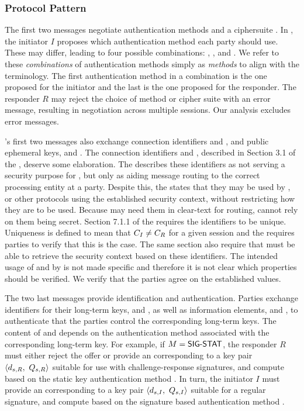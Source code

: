 \subsubsection{Protocol Pattern}
The first two messages negotiate authentication methods \mMethod{} and a
ciphersuite \mSuites{}.
%
In \mMethod{}, the initiator $I$ proposes which authentication method each
party should use.
%
These may differ, leading to four possible combinations:
\mSigSig{}, \mSigStat{}, \mStatSig{} and \mStatStat{}.
%
We refer to these \emph{combinations} of authentication methods simply as
\emph{methods} to align with the \mSpec{} terminology.
%
The first authentication method in a combination is the one proposed for the
initiator and the last is the one proposed for the responder.
%
The responder $R$ may reject the choice of method
or cipher suite with an error message, resulting in negotiation across
multiple \mEdhoc{} sessions.
%
Our analysis excludes error messages.
%

\mEdhoc{}'s first two messages also exchange connection identifiers \mCi{} and
\mCr{}, and public ephemeral keys, \mGx{} and \mGy{}.
%
The connection identifiers \mCi{} and \mCr{}, described in Section 3.1 of the
\mSpec{}, deserve some elaboration.
%
The \mSpec{} describes these identifiers as not serving a security purpose for
\mEdhoc{}, but only as aiding message routing to the correct \mEdhoc{} processing
entity at a party.
%
Despite this, the \mSpec{} states that they may be used by \mOscore{}, or other
protocols using the established security context, without restricting how they
are to be used.
%
Because \mEdhoc{} may need them in clear-text for routing, \mOscore{} cannot
rely on them being secret.
%
Section 7.1.1 of the \mSpec{} requires the identifiers to be unique.
%
Uniqueness is defined to mean that $C_I{} \not = C_R{}$ for a given session
and the \mSpec{} requires parties to verify that this is the case.
%
The same section also require that \mOscore{} must be able to retrieve the
security context based on these identifiers.
%
The intended usage of \mCi{} and \mCr{} by \mOscore{} is not made specific and
therefore it is not clear which properties should be verified.
%
We verify that the parties agree on the established values.
%

The two last messages provide identification and authentication.
%
Parties exchange identifiers for their long-term keys, \mIdcredi{} and \mIdcredr{},
as well as information elements, \mAuthi{} and \mAuthr{}, to authenticate
that the parties control the corresponding long-term keys.
%
The content of \mAuthi{} and \mAuthr{} depends on the authentication method
associated with the corresponding long-term key.
%
For example, if $M{} = \textsf{SIG-STAT}{}$, the responder $R$ must either
reject the offer or provide an \mIdcredr{} corresponding to a key pair
$\langle d_{s,R},\ Q_{s,R}\rangle$ suitable for use with challenge-response
signatures, and
compute \mAuthr{} based on the static key authentication method \mStat{}.
%
In turn, the initiator $I$ must provide an \mIdcredi{} corresponding to a key
pair $\langle d_{s,I},\ Q_{s,I}\rangle$ suitable for a regular signature,
and compute
\mAuthi{} based on the signature based authentication method \mSig{}.
%

